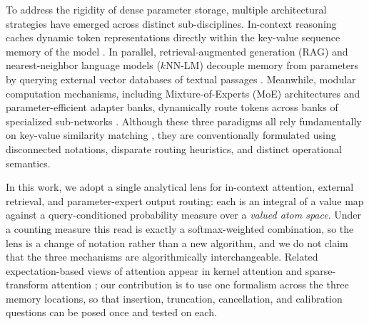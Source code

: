 \documentclass[preprint,12pt]{elsarticle}
\begin{document}
To address the rigidity of dense parameter storage, multiple architectural strategies have emerged across distinct sub-disciplines. In-context reasoning caches dynamic token representations directly within the key-value sequence memory of the model \cite{vaswani2017attention}. In parallel, retrieval-augmented generation (RAG) and nearest-neighbor language models ($k$NN-LM) decouple memory from parameters by querying external vector databases of textual passages \cite{lewis2020rag, khandelwal2020generalization, borgeaud2022improving}. Meanwhile, modular computation mechanisms, including Mixture-of-Experts (MoE) architectures and parameter-efficient adapter banks, dynamically route tokens across banks of specialized sub-networks \cite{shazeer2017outrageously, hu2021lora, jiang2024mixtral}. Although these three paradigms all rely fundamentally on key-value similarity matching \cite{geva2021transformer, lample2019large, tsai2019transformer}, they are conventionally formulated using disconnected notations, disparate routing heuristics, and distinct operational semantics.

In this work, we adopt a single analytical lens for in-context attention, external retrieval, and parameter-expert output routing: each is an integral of a value map against a query-conditioned probability measure over a \emph{valued atom space}. Under a counting measure this read is exactly a softmax-weighted combination, so the lens is a change of notation rather than a new algorithm, and we do not claim that the three mechanisms are algorithmically interchangeable. Related expectation-based views of attention appear in kernel attention \cite{tsai2019transformer} and sparse-transform attention \cite{martins2020sparse}; our contribution is to use one formalism across the three memory locations, so that insertion, truncation, cancellation, and calibration questions can be posed once and tested on each.
\end{document}
